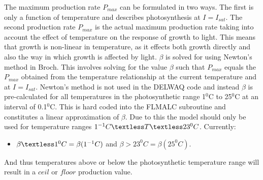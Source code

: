 \documentclass{deltares_manual}
\begin{document}
The maximum production rate $P_{max}$ can be formulated in two ways. The first is only a function of temperature and describes photosynthesis at $I = I_{sat}$. The second production rate $P_{max}$ is the actual maximum production rate taking into account the effect of temperature on the response of growth to light. This means that growth is non-linear in temperature, as it effects both growth directly and also the way in which growth is affected by light. $\beta$ is solved for using Newton's method in Broch. This involves solving for the value $\beta$ such that $P_{max}$ equals the $P_{max}$ obtained from the temperature relationship at the current temperature and at $I = I_{sat}$. Newton's method is not used in the DELWAQ code and instead $\beta$ is pre-calculated for all temperatures in the photosynthetic range 1$^{0}$C to 25$^{0}$C at an interval of 0.1$^{0}$C. This is hard coded into the FLMALC subroutine and constitutes a linear approximation of $\beta$. Due to this the model should only be used for temperature ranges $1^{-1}C \textless T \textless 23^{0}C$. Currently:
\begin{itemize}
	\item $\beta \textless 1 ^{0}C = \beta(1 ^{-1}C)$ and $\beta > 23 ^{0}C = \beta(25 ^{0}C)$. 
\end{itemize} 

And thus temperatures above or below the photosynthetic temperature range will result in a $ceil$ or $floor$ production value.
\end{document}
